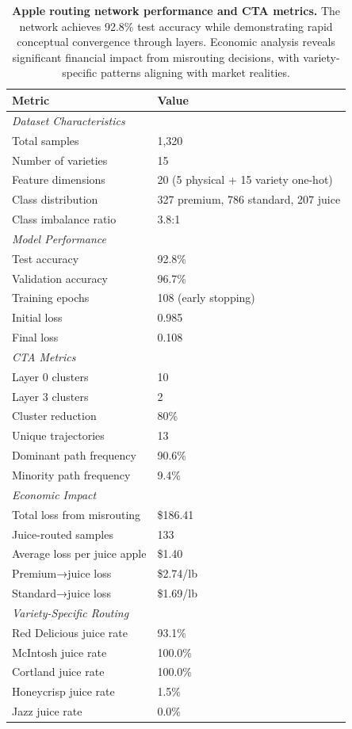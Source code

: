 \begin{table}[htbp]
\centering
\caption{\textbf{Apple routing network performance and CTA metrics.} The network achieves 92.8\% test accuracy while demonstrating rapid conceptual convergence through layers. Economic analysis reveals significant financial impact from misrouting decisions, with variety-specific patterns aligning with market realities.}
\label{tab:apple_results}
\begin{tabular}{ll}
\toprule
\textbf{Metric} & \textbf{Value} \\
\midrule
\multicolumn{2}{l}{\textit{Dataset Characteristics}} \\
Total samples & 1,320 \\
Number of varieties & 15 \\
Feature dimensions & 20 (5 physical + 15 variety one-hot) \\
Class distribution & 327 premium, 786 standard, 207 juice \\
Class imbalance ratio & 3.8:1 \\
\midrule
\multicolumn{2}{l}{\textit{Model Performance}} \\
Test accuracy & 92.8\% \\
Validation accuracy & 96.7\% \\
Training epochs & 108 (early stopping) \\
Initial loss & 0.985 \\
Final loss & 0.108 \\
\midrule
\multicolumn{2}{l}{\textit{CTA Metrics}} \\
Layer 0 clusters & 10 \\
Layer 3 clusters & 2 \\
Cluster reduction & 80\% \\
Unique trajectories & 13 \\
Dominant path frequency & 90.6\% \\
Minority path frequency & 9.4\% \\
\midrule
\multicolumn{2}{l}{\textit{Economic Impact}} \\
Total loss from misrouting & \$186.41 \\
Juice-routed samples & 133 \\
Average loss per juice apple & \$1.40 \\
Premium→juice loss & \$2.74/lb \\
Standard→juice loss & \$1.69/lb \\
\midrule
\multicolumn{2}{l}{\textit{Variety-Specific Routing}} \\
Red Delicious juice rate & 93.1\% \\
McIntosh juice rate & 100.0\% \\
Cortland juice rate & 100.0\% \\
Honeycrisp juice rate & 1.5\% \\
Jazz juice rate & 0.0\% \\
\bottomrule
\end{tabular}
\end{table}